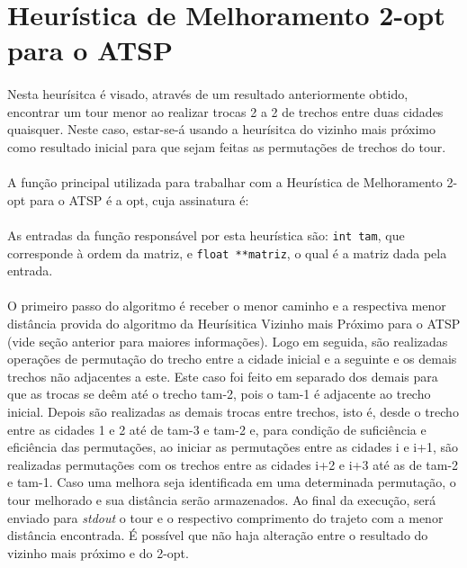 \documentclass[12pt,a4paper]{article}
\begin{document}
 \newpage
 \section{Heurística de Melhoramento 2-opt para o ATSP}
  {\paragraph{} Nesta heurísitca é visado, através de um resultado anteriormente obtido, encontrar um tour menor ao realizar trocas 2 a 2 de trechos entre duas cidades quaisquer. Neste caso, estar-se-á usando a heurísitca do vizinho mais próximo como resultado inicial para que sejam feitas as permutações de trechos do tour. }
  {\paragraph{} A função principal utilizada para trabalhar com a Heurística de Melhoramento 2-opt para o ATSP é a opt, cuja assinatura é: }
  {\paragraph{} As entradas da função responsável por esta heurística são: {\tt int tam}, que corresponde à ordem da matriz, e {\tt float **matriz}, o qual é a matriz dada pela entrada.}
  {\paragraph{} O primeiro passo do algoritmo é receber o menor caminho e a respectiva menor distância provida do algoritmo da Heurísitica Vizinho mais Próximo para o ATSP (vide seção anterior para maiores informações). Logo em seguida, são realizadas operações de permutação do trecho entre a cidade inicial e a seguinte e os demais trechos não adjacentes a este. Este caso foi feito em separado dos demais para que as trocas se deêm até o trecho tam-2, pois o tam-1 é adjacente ao trecho inicial. Depois são realizadas as demais trocas entre trechos, isto é, desde o trecho entre as cidades 1 e 2 até de tam-3 e tam-2 e, para condição de suficiência e eficiência das permutações, ao iniciar as permutações entre as cidades i e i+1, são realizadas permutações com os trechos entre as cidades i+2 e i+3 até as de tam-2 e tam-1. Caso uma melhora seja identificada em uma determinada permutação, o tour melhorado e sua distância serão armazenados. Ao final da execução, será enviado para {\it stdout} o tour e o respectivo comprimento do trajeto com a menor distância encontrada. É possível que não haja alteração entre o resultado do vizinho mais próximo e do 2-opt. }
\end{document}
